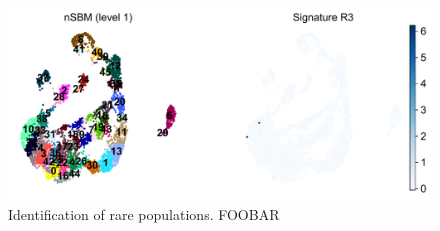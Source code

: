 \documentclass[11pt, titlepage, twoside]{article}
\begin{document}
\clearpage
\begin{figure}[H]
\centering
\includegraphics[keepaspectratio,width=1\textwidth,height=\textheight]{Figure_Rare_Cells_Supp.pdf}
\caption[]{Identification of rare populations. FOOBAR} \label{Figure_Rare_Supp}
\end{figure}
\end{document}
